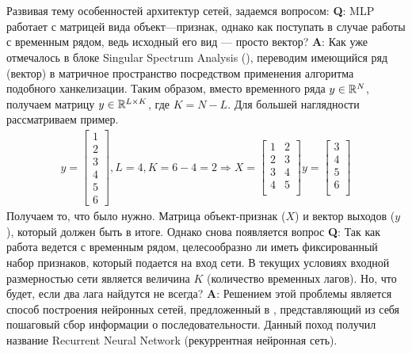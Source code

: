  \label{link::rnn_module}
\\\\
\indent Развивая тему особенностей архитектур сетей, задаемся вопросом: \textbf{Q}: MLP работает с матрицей вида объект---признак, однако как поступать в случае работы с временным рядом, ведь исходный его вид --- просто вектор? \textbf{A}: Как уже отмечалось в блоке Singular Spectrum Analysis (), переводим имеющийся ряд (вектор) в матричное пространство посредством применения алгоритма подобного ханкелизации. Таким образом, вместо временного ряда $y \in \mathbb{R}^{N}$, получаем матрицу $y \in \mathbb{R}^{L \times K}$, где $K  = N - L$. Для большей наглядности рассматриваем пример.
\begin{equation}
	\begin{split}
		y = \left[\begin{matrix}
			1\\2\\3\\4\\5\\6
		\end{matrix}\right], L = 4, K = 6 - 4 = 2 \Rightarrow
		X = \left[\begin{matrix}
			1 & 2\\
			2 & 3\\
			3 & 4\\
			4 & 5\\
		\end{matrix}\right]
		y = \left[\begin{matrix}
			3\\
			4\\
			5\\
			6\\
		\end{matrix}\right]
	\end{split}	
\end{equation}
Получаем то, что было нужно. Матрица объект-признак ($X$) и вектор выходов ($y$), который должен быть в итоге. Однако снова появляется вопрос \textbf{Q}: Так как работа ведется с временным рядом, целесообразно ли иметь фиксированный набор признаков, который подается на вход сети. В текущих условиях входной размерностью сети является величина $K$ (количество временных лагов). Но, что будет, если два лага найдутся не всегда? \textbf{A}: Решением этой проблемы является способ построения нейронных сетей, предложенный в \cite{hochreiter1997long, rumelhart1986learning}, представляющий из себя пошаговый сбор информации о последовательности. Данный поход получил название Recurrent Neural Network (рекуррентная нейронная сеть).

